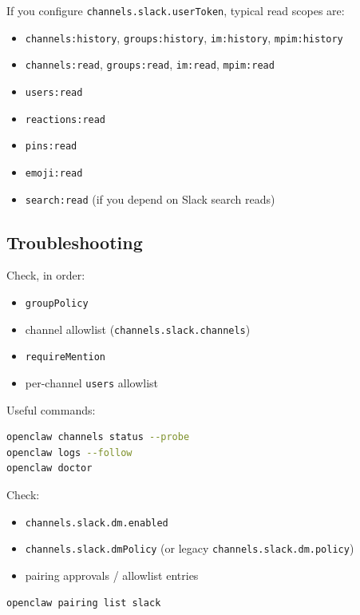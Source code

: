If you configure \texttt{channels.slack.userToken}, typical read scopes are:

\begin{itemize}
  \item \texttt{channels:history}, \texttt{groups:history}, \texttt{im:history}, \texttt{mpim:history}
  \item \texttt{channels:read}, \texttt{groups:read}, \texttt{im:read}, \texttt{mpim:read}
  \item \texttt{users:read}
  \item \texttt{reactions:read}
  \item \texttt{pins:read}
  \item \texttt{emoji:read}
  \item \texttt{search:read} (if you depend on Slack search reads)
\end{itemize}



\subsection{Troubleshooting}


Check, in order:

\begin{itemize}
  \item \texttt{groupPolicy}
  \item channel allowlist (\texttt{channels.slack.channels})
  \item \texttt{requireMention}
  \item per-channel \texttt{users} allowlist
\end{itemize}


Useful commands:

\begin{lstlisting}[language=bash]
openclaw channels status --probe
openclaw logs --follow
openclaw doctor
\end{lstlisting}



Check:

\begin{itemize}
  \item \texttt{channels.slack.dm.enabled}
  \item \texttt{channels.slack.dmPolicy} (or legacy \texttt{channels.slack.dm.policy})
  \item pairing approvals / allowlist entries
\end{itemize}


\begin{lstlisting}[language=bash]
openclaw pairing list slack
\end{lstlisting}



